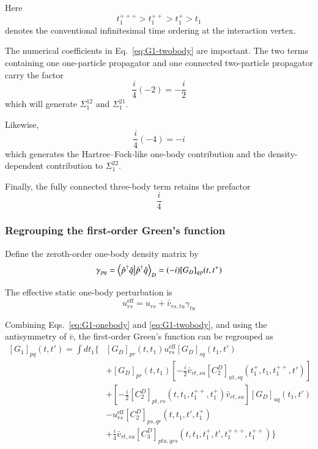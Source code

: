 \documentclass[aip,jcp,reprint,noshowkeys,superscriptaddress]{revtex4-1}
\begin{document}
Here
\begin{equation}
  t_1^{+++}
  >
  t_1^{++}
  >
  t_1^+
  >
  t_1
\end{equation}
denotes the conventional infinitesimal time ordering at the
interaction vertex.

The numerical coefficients in
Eq.~\eqref{eq:G1-twobody} are important.  The two terms containing one
one-particle propagator and one connected two-particle propagator carry
the factor
\begin{equation}
  \frac{i}{4}(-2)
  =
  -\frac{i}{2}
\end{equation}
which will generate $\Sigma_1^{12}$ and $\Sigma_1^{21}$.

Likewise,
\begin{equation}
  \frac{i}{4}(-4)
  =
  -i
\end{equation}
which generates the Hartree--Fock-like one-body contribution and the
density-dependent contribution to $\Sigma_1^{22}$.

Finally, the fully connected three-body term retains the prefactor
\begin{equation}
  \frac{i}{4}
\end{equation}


\subsubsection{Regrouping the first-order Green's function}

Define the zeroth-order one-body density matrix by
\begin{equation}
  \gamma_{pq}
  =
  \braket{
    \hat p^\dagger\hat q
  }_D
  =
  (-i)
  [G_D]_{qp}(t,t^+)
  \label{eq:reference-density}
\end{equation}

The effective static one-body perturbation is
\begin{equation}
  u^{\mathrm{eff}}_{rs}
  =
  u_{rs}
  +
  \bar v_{rs,tu}\gamma_{tu}
  \label{eq:u-effective}
\end{equation}

Combining Eqs.~\eqref{eq:G1-onebody} and
\eqref{eq:G1-twobody}, and using the antisymmetry of $\bar v$, the
first-order Green's function can be regrouped as
\begin{equation}
  \begin{aligned}
  [G_1]_{pq}(t,t')
  =
  \int dt_1
  \Big\{
  &
  [G_D]_{pr}(t,t_1)
  u^{\mathrm{eff}}_{rs}
  [G_D]_{sq}(t_1,t')
  \\[1mm]
  &
  +
  [G_D]_{pr}(t,t_1)
  \left[
  -\frac{i}{2}
  \bar v_{rt,su}
  [C_2^D]_{ut,sq}
  (t_1^+,t_1,t_1^{++},t')
  \right]
  \\[1mm]
  &
  +
  \left[
  -\frac{i}{2}
  [C_2^D]_{pt,rs}
  (t,t_1,t_1^{++},t_1^+)
  \bar v_{rt,su}
  \right]
  [G_D]_{uq}(t_1,t')
  \\[1mm]
  &
  -
  u^{\mathrm{eff}}_{rs}
  [C_2^D]_{ps,qr}
  (t,t_1,t',t_1^+)
  \\[1mm]
  &
  +
  \frac{i}{4}
  \bar v_{rt,su}
  [C_3^D]_{ptu,qrs}
  (t,t_1,t_1^+,t',t_1^{+++},t_1^{++})
  \Big\}
  \end{aligned}
  \label{eq:G1-regrouped}
\end{equation}
\end{document}
